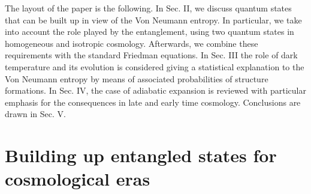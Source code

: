 \documentclass[nofootinbib,prd,superscriptaddress,showpacs,showkeys,]{revtex4}
\begin{document}
The  layout of the paper  is the  following. In Sec. II, we discuss  quantum states that can be built up in view of  the Von Neumann entropy. In particular, we take into account the role played by the entanglement, using  two quantum states in  homogeneous and isotropic cosmology. Afterwards, we combine these requirements with the standard Friedman equations. In Sec. III the role of  dark temperature and its evolution is considered giving a statistical explanation to the Von Neumann entropy by means of associated probabilities of structure formations. In Sec. IV, the case of adiabatic expansion is reviewed with particular emphasis for the consequences in late and early time cosmology. Conclusions are drawn in Sec. V.


































\section{Building up entangled states for cosmological eras}
\end{document}
